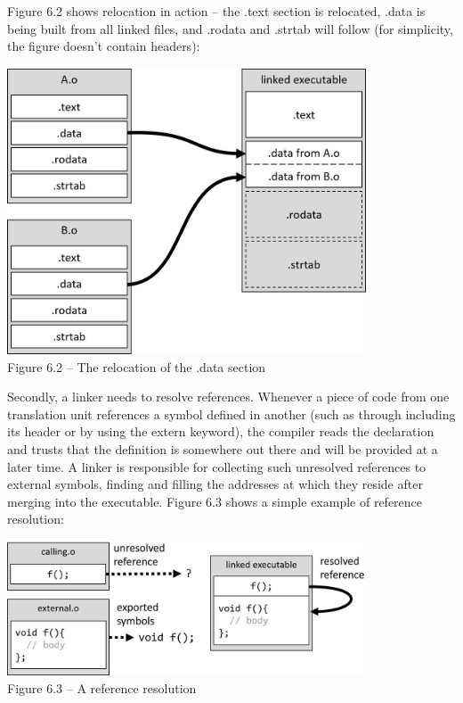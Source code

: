 Figure 6.2 shows relocation in action – the .text section is relocated, .data is being built from all linked files, and .rodata and .strtab will follow (for simplicity, the figure doesn't contain headers):

\begin{center}
\includegraphics[width=0.8\textwidth]{content/2/chapter6/images/2.jpg}\\
Figure 6.2 – The relocation of the .data section
\end{center}

Secondly, a linker needs to resolve references. Whenever a piece of code from one translation unit references a symbol defined in another (such as through including its header or by using the extern keyword), the compiler reads the declaration and trusts that the definition is somewhere out there and will be provided at a later time. A linker is responsible for collecting such unresolved references to external symbols, finding and filling the addresses at which they reside after merging into the executable. Figure 6.3 shows a simple example of reference resolution:

\begin{center}
\includegraphics[width=0.8\textwidth]{content/2/chapter6/images/3.jpg}\\
Figure 6.3 – A reference resolution
\end{center}

